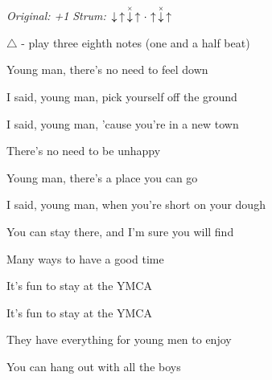 \begin{song}


\begin{headerbox}
\RaiseBoxWithChucks
\textit{Original: +1} \quad
\textit{Strum:} $\Down\Up\ChuckDown\Up\Miss\Up\ChuckDown\Up$
\end{headerbox}

\begin{vchordbox}
\end{vchordbox}

\large

\bigskip


\smaller
$\triangle$ - play three eighth notes (one and a half beat)
\larger

\bigskip

Young man, there's no need to feel down \par
I said, young man, pick yourself off the ground \par
I said, young man, 'cause you're in a new town \par
There's no need to be unhappy \par

\bigskip

Young man, there's a place you can go \par
I said, young man, when you're short on your dough \par
You can stay there, and I'm sure you will find \par
Many ways to have a good time \par
{}  \par

\bigskip

\begin{chorusbox}{\Chorus}
It's fun to stay at the YMCA \par
It's fun to stay at the YMCA \par
They have everything for young men to enjoy \par
You can hang out with all the boys \par


\end{chorusbox}
\end{song}
